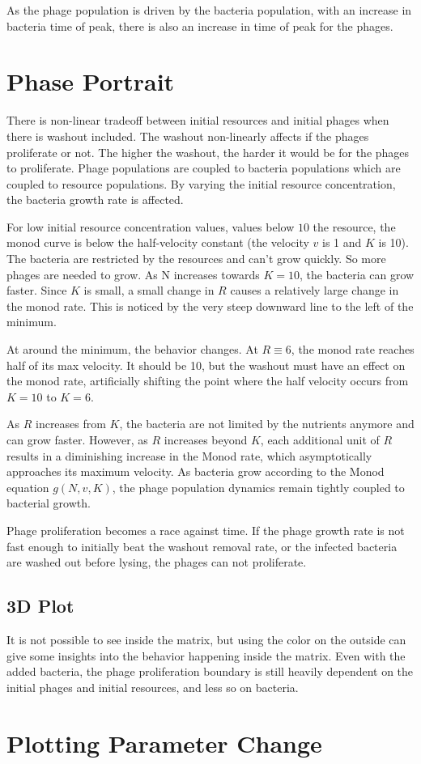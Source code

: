 As the phage population is driven by the bacteria population, with an increase in bacteria time of peak, there is also an increase in time of peak for the phages. 


\section{Phase Portrait}
There is non-linear tradeoff between initial resources and initial phages when there is washout included. 
The washout non-linearly affects if the phages proliferate or not. 
The higher the washout, the harder it would be for the phages to proliferate. 
Phage populations are coupled to bacteria populations which are coupled to resource populations. 
By varying the initial resource concentration, the bacteria growth rate is affected. 

For low initial resource concentration values, values below $10$ the resource, the monod curve is below the half-velocity constant (the velocity $v$ is 1 and $K$ is 10). 
The bacteria are restricted by the resources and can't grow quickly. 
So more phages are needed to grow. 
As N increases towards $K=10$, the bacteria can grow faster. 
Since $K$ is small, a small change in $R$ causes a relatively large change in the monod rate. 
This is noticed by the very steep downward line to the left of the minimum. 

At around the minimum, the behavior changes. 
At $R\equiv 6$, the monod rate reaches half of its max velocity. 
It should be 10, but the washout must have an effect on the monod rate, artificially shifting the point where the half velocity occurs from $K=10$ to $K=6$. 

As $R$ increases from $K$, the bacteria are not limited by the nutrients anymore and can grow faster. 
However, as $R$ increases beyond $K$, each additional unit of $R$ results in a diminishing increase in the Monod rate, which asymptotically approaches its maximum velocity. 
As bacteria grow according to the Monod equation $g(N, v, K)$, the phage population dynamics remain tightly coupled to bacterial growth. 

Phage proliferation becomes a race against time. 
If the phage growth rate is not fast enough to initially beat the washout removal rate, or the infected bacteria are washed out before lysing, the phages can not proliferate. 

\subsection{3D Plot}
It is not possible to see inside the matrix, but using the color on the outside can give some insights into the behavior happening inside the matrix. 
Even with the added bacteria, the phage proliferation boundary is still heavily dependent on the initial phages and initial resources, and less so on bacteria. 


\section{Plotting Parameter Change}
